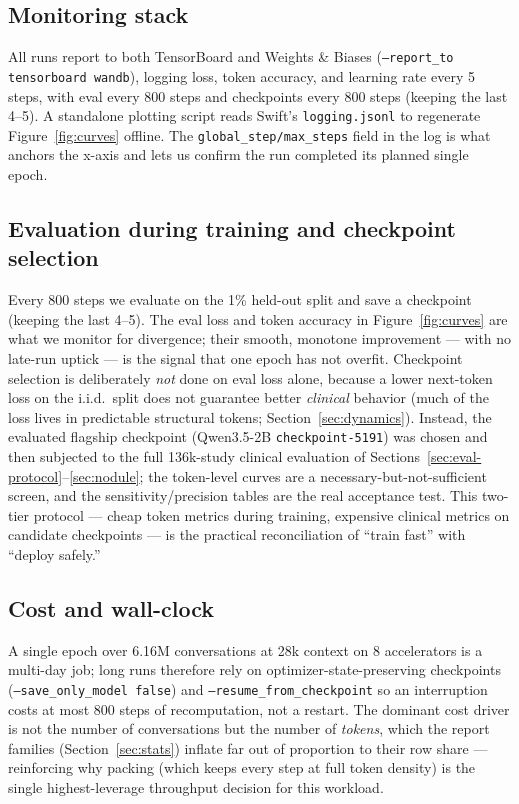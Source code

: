 \documentclass[11pt,a4paper]{article}
\begin{document}
\subsection{Monitoring stack}
All runs report to both TensorBoard and Weights \& Biases (\texttt{--report\_to tensorboard wandb}), logging loss, token accuracy, and learning rate every 5 steps, with eval every 800 steps and checkpoints every 800 steps (keeping the last 4--5). A standalone plotting script reads Swift's \texttt{logging.jsonl} to regenerate Figure~\ref{fig:curves} offline. The \texttt{global\_step/max\_steps} field in the log is what anchors the x-axis and lets us confirm the run completed its planned single epoch.

\subsection{Evaluation during training and checkpoint selection}
Every 800 steps we evaluate on the 1\% held-out split and save a checkpoint (keeping the last 4--5). The eval loss and token accuracy in Figure~\ref{fig:curves} are what we monitor for divergence; their smooth, monotone improvement --- with no late-run uptick --- is the signal that one epoch has not overfit. Checkpoint selection is deliberately \emph{not} done on eval loss alone, because a lower next-token loss on the i.i.d.\ split does not guarantee better \emph{clinical} behavior (much of the loss lives in predictable structural tokens; Section~\ref{sec:dynamics}). Instead, the evaluated flagship checkpoint (Qwen3.5-2B \texttt{checkpoint-5191}) was chosen and then subjected to the full 136k-study clinical evaluation of Sections~\ref{sec:eval-protocol}--\ref{sec:nodule}; the token-level curves are a necessary-but-not-sufficient screen, and the sensitivity/precision tables are the real acceptance test. This two-tier protocol --- cheap token metrics during training, expensive clinical metrics on candidate checkpoints --- is the practical reconciliation of ``train fast'' with ``deploy safely.''

\subsection{Cost and wall-clock}
A single epoch over 6.16M conversations at 28k context on 8 accelerators is a multi-day job; long runs therefore rely on optimizer-state-preserving checkpoints (\texttt{--save\_only\_model false}) and \texttt{--resume\_from\_checkpoint} so an interruption costs at most 800 steps of recomputation, not a restart. The dominant cost driver is not the number of conversations but the number of \emph{tokens}, which the report families (Section~\ref{sec:stats}) inflate far out of proportion to their row share --- reinforcing why packing (which keeps every step at full token density) is the single highest-leverage throughput decision for this workload.
\end{document}
